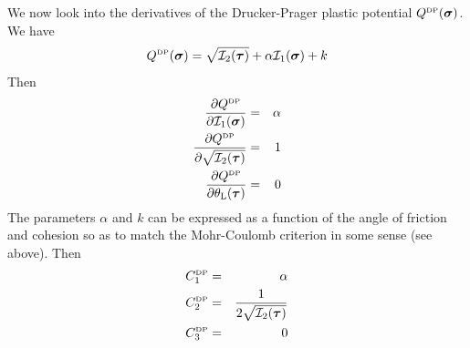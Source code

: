 \vspace{.5cm}

We now look into the derivatives of the Drucker-Prager plastic potential $Q^{\text{\tiny DP}}(\bm\sigma)$.
We have
\[
Q^{\text{\tiny DP}} (\bm\sigma)= \sqrt{{\cal I}_2({\bm \tau})} + \alpha {\cal I}_1({\bm \sigma}) + k 
\]
Then
\begin{eqnarray}
\frac{\partial Q^{\text{\tiny DP}} }{\partial {\cal I}_1(\bm\sigma)} &=& \alpha \\
\frac{\partial Q^{\text{\tiny DP}} }{\partial \sqrt{{\cal I}_2(\bm\tau)}}&=& 1  \\
\frac{\partial Q^{\text{\tiny DP}} }{\partial \theta_{\rm L}(\bm\tau)} &=& 0 
\end{eqnarray}
The parameters $\alpha$ and $k$ can be expressed as a function of the angle of friction 
and cohesion so as to match the Mohr-Coulomb criterion in some sense (see above).
Then
\begin{eqnarray}
C_1^{\text{\tiny DP}} &=& \alpha  \\ 
C_2^{\text{\tiny DP}} &=& \frac{1}{2  \sqrt{{\cal I}_2(\bm\tau)}   }  \\ 
C_3^{\text{\tiny DP}} &=& 0  
\end{eqnarray}











\newpage
